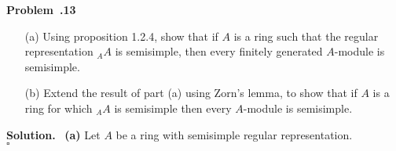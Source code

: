 \documentclass[12pt]{article}
\newenvironment{prob}[1]{\par\smallskip
	\noindent\begin{mdframed}\small \textbf{Problem~\thesection.#1} \rmfamily\quad}{\end{mdframed}\medskip}
\newenvironment{sol}{\noindent \textbf{Solution.} \,}{\\\hspace*{\fill}$\square$\medskip}
\begin{document}
\begin{prob}{13}
	\begin{itemize}
		\item[(a)] Using proposition 1.2.4, show that if $A$ is a ring such that the regular representation $_AA$ is semisimple, then every finitely generated $A$-module is semisimple.
		\item[(b)] Extend the result of part (a) using Zorn's lemma, to show that if $A$ is a ring for which $_AA$ is semisimple then every $A$-module is semisimple.
	\end{itemize}
\end{prob}
\begin{sol}
	\textbf{(a)}\hspace{1ex} Let $A$ be a ring with semisimple regular representation.
\end{sol}
\end{document}
